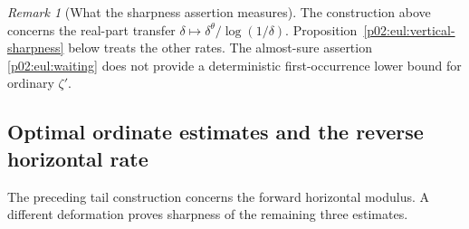 \documentclass[11pt,letterpaper]{article}
\theoremstyle{definition}
\theoremstyle{remark}
\newtheorem{remark}[theorem]{Remark}
\newcommand{\1}{\mathbf 1}
\begin{document}
\begin{remark}[What the sharpness assertion measures]
The construction above concerns the real-part transfer
$\delta\mapsto\delta^\theta/\log(1/\delta)$.
Proposition~\ref{p02:eul:vertical-sharpness} below treats the other rates.
The almost-sure assertion \eqref{p02:eul:waiting} does not provide a deterministic
first-occurrence lower bound for ordinary $\zeta'$.
\end{remark}


\subsection{Optimal ordinate estimates and the reverse horizontal rate}

The preceding tail construction concerns the forward horizontal
modulus. A different deformation proves sharpness of the remaining
three estimates.
\end{document}
